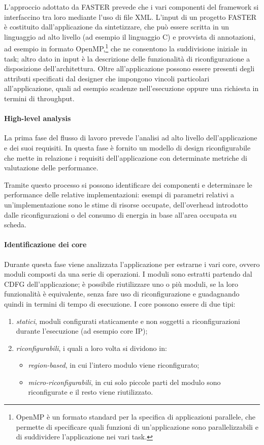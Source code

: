 L'approccio adottato da \ac{FASTER} prevede che i vari componenti del framework
si interfaccino tra loro mediante l'uso di file XML. L'input di un progetto
\ac{FASTER} è costituito dall'applicazione da sintetizzare, che può essere
scritta in un linguaggio ad alto livello (ad esempio il linguaggio C) e
provvista di annotazioni, ad esempio in formato OpenMP,\footnote{OpenMP è un
  formato standard per la specifica di applicazioni parallele, che permette di
  specificare quali funzioni di un'applicazione sono parallelizzabili e di
suddividere l'applicazione nei vari task.} che ne consentono la suddivisione
iniziale in task; altro dato in input \`e la descrizione delle funzionalità di
riconfigurazione a disposizione dell'architettura. Oltre all'applicazione
possono essere presenti degli attributi specificati dal designer che impongono
vincoli particolari all'applicazione, quali ad esempio scadenze nell'esecuzione
oppure una richiesta in termini di throughput.

\paragraph{High-level analysis}
La prima fase del flusso di lavoro prevede l'analisi ad alto livello 
dell'applicazione e dei suoi requisiti. In questa fase è fornito un modello di 
design riconfigurabile che mette in relazione i requisiti dell'applicazione con 
determinate metriche di valutazione delle performance.

Tramite questo processo si possono identificare dei componenti e determinare le 
performance delle relative implementazioni: esempi di parametri relativi a
un'implementazione sono le stime di risorse occupate, dell'overhead introdotto 
dalle riconfigurazioni o del consumo di energia in base all'area occupata su 
scheda.

\paragraph{Identificazione dei core}
Durante questa fase viene analizzata l'applicazione per estrarne i vari core, 
ovvero moduli composti da una serie di operazioni. I moduli sono estratti 
partendo dal \ac{CDFG} dell'applicazione; è possibile 
riutilizzare uno o più moduli, se la loro funzionalit\`a \`e equivalente,
senza fare uso di riconfigurazione e guadagnando 
quindi in termini di tempo di esecuzione.
I core possono essere di due tipi:
\begin{enumerate}
 \item \emph{statici}, moduli configurati staticamente e non soggetti a
   riconfigurazioni durante l'esecuzione (ad esempio core IP);
 \item \emph{riconfigurabili}, i quali a loro volta si dividono in:
  \begin{itemize}
   \item \emph{region-based}, in cui l'intero modulo viene riconfigurato;
   \item \emph{micro-riconfigurabili}, in cui solo piccole parti del modulo 
sono riconfigurate e il resto viene riutilizzato.
  \end{itemize}
\end{enumerate}

